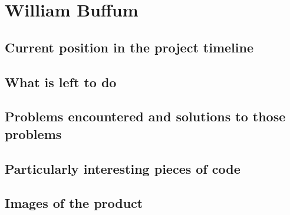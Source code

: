 \documentclass[draftclsnofoot,onecolumn,letterpaper,10pt,compsoc]{IEEEtran}
\begin{document}
\section{William Buffum}
\subsection{Current position in the project timeline}
\subsection{What is left to do}
\subsection{Problems encountered and solutions to those problems}
\subsection{Particularly interesting pieces of code}
\subsection{Images of the product}
\end{document}
